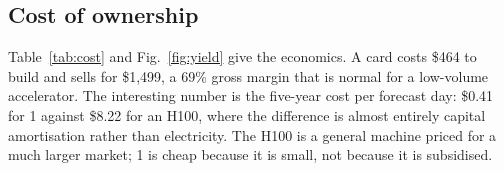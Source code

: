 \subsection{Cost of ownership}
Table~\ref{tab:cost} and Fig.~\ref{fig:yield} give the economics. A card costs \$464 to build and
sells for \$1,499, a 69\% gross margin that is normal for a low-volume accelerator. The interesting
number is the five-year cost per forecast day: \$0.41 for \ac{1} against \$8.22 for an H100, where
the difference is almost entirely capital amortisation rather than electricity. The H100 is a
general machine priced for a much larger market; \ac{1} is cheap because it is small, not because
it is subsidised.
